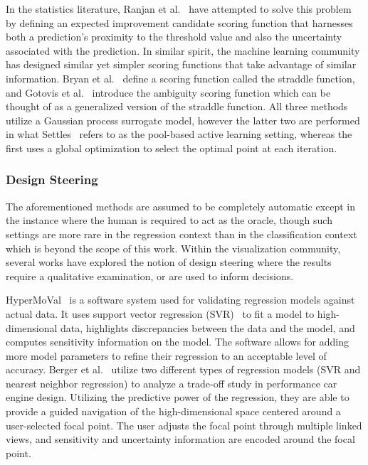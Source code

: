 In the statistics literature, Ranjan et al.~\cite{RanjanBinghamMichailidis2008} have attempted to solve this problem by defining an expected improvement candidate scoring function that harnesses both a prediction's proximity to the threshold value and also the uncertainty associated with the prediction.
%
In similar spirit, the machine learning community has designed similar yet simpler scoring functions that take advantage of similar information.
%
Bryan et al.~\cite{BryanSchneiderNichol2005} define a scoring function called the straddle function, and Gotovis et al.~\cite{GotovosCasatiHitz2013} introduce the ambiguity scoring function which can be thought of as a generalized version of the straddle function.
%
All three methods utilize a Gaussian process surrogate model, however the latter two are performed in what Settles~\cite{Settles2009} refers to as the pool-based active learning setting, whereas the first uses a global optimization to select the optimal point at each iteration.


\subsubsection{Design Steering}

The aforementioned methods are assumed to be completely automatic except in the instance where the human is required to act as the oracle, though such settings are more rare in the regression context than in the classification context which is beyond the scope of this work.
%
Within the visualization community, several works have explored the notion of design steering where the results require a qualitative examination, or are used to inform decisions.

HyperMoVal~\cite{PiringerBergerKrasser2010} is a software system used for validating regression models against actual data.
%
It uses support vector regression (SVR)~\cite{SmolaScholkopf2004} to fit a model to high-dimensional data, highlights discrepancies between the data and the model, and computes sensitivity information on the model.
%
The software allows for adding more model parameters to refine their regression to an acceptable level of accuracy.
%
Berger et al.~\cite{BergerPiringerFilzmoser2011} utilize two different types of regression models (SVR and nearest neighbor regression) to analyze a trade-off study in performance car engine design.
%
Utilizing the predictive power of the regression, they are able to provide a guided navigation of the high-dimensional space centered around a user-selected focal point.
%
The user adjusts the focal point through multiple linked views, and sensitivity and uncertainty information are encoded around the focal point.

